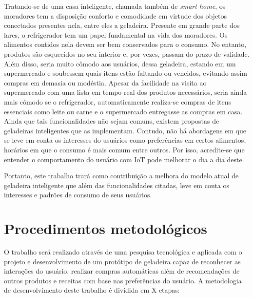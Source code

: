 Tratando-se de uma casa inteligente, chamada também de \textit{smart home}, os moradores tem a disposição conforto e comodidade em virtude dos objetos conectados presentes nela, entre eles a geladeira. Presente em grande parte dos lares, o refrigerador tem um papel fundamental na vida dos moradores. Os alimentos contidos nela devem ser bem conservados para o consumo. No entanto, produtos são esquecidos no seu interior e, por vezes, passam do prazo de validade. Além disso, seria muito cômodo aos usuários, dessa geladeira, estando em um supermercado e soubessem quais itens estão faltando ou vencidos, evitando assim compras em demasia ou modéstia. Apesar da facilidade na visita ao supermercado com uma lista em tempo real dos produtos necessários, seria ainda mais cômodo se o refrigerador, automaticamente realiza-se compras de itens essenciais como leite ou carne e o supermercado entregasse as compras em casa. Ainda que tais funcionalidades não sejam comuns, existem propostas de geladeiras inteligentes que as implementam. Contudo, não há abordagens em que se leve em conta os interesses do usuários como preferências em certos alimentos, horários em que o consumo é mais comum entre outros. Por isso, acredite-se que entender o comportamento do usuário com IoT pode melhorar o dia a dia deste.

Portanto, este trabalho trará como contribuição a melhora do modelo atual de geladeira inteligente que além das funcionalidades citadas, leve em conta os interesses e padrões de consumo de seus usuários.





\section{Procedimentos metodológicos}

O trabalho será realizado através de uma pesquisa tecnológica e aplicada com o projeto e desenvolvimento de um protótipo de geladeira capaz de reconhecer as interações do usuário, realizar compras automáticas além de recomendações de outros produtos e receitas com base nas preferências do usuário. A metodologia de desenvolvimento deste trabalho é dividida em X etapas:

